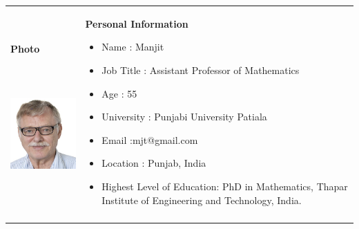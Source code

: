 \documentclass[12pt]{article}
\begin{document}


\begin{table}[H]
 			\centering
\begin{tabular}{p{1.6in}p{4.09in}}
\hline
\multicolumn{1}{|p{1.6in}}{{\fontsize{10pt}{12.0pt}\selectfont \textbf{Photo}} \par {\fontsize{10pt}{12.0pt}\selectfont \textbf{\ \ \ \ \   }} \par 
	\begin{Center}
		\includegraphics[width=1.6in,height=1.36in]{./media/image2.png}
	\end{Center}
} & 
\multicolumn{1}{|p{4.09in}|}{{\fontsize{10pt}{12.0pt}\selectfont \textbf{Personal Information}} \par \begin{itemize}
	\item {\fontsize{10pt}{12.0pt}\selectfont Name : Manjit} \par 	\item {\fontsize{10pt}{12.0pt}\selectfont Job Title : Assistant Professor of Mathematics} \par 	\item {\fontsize{10pt}{12.0pt}\selectfont Age : 55} \par 	\item {\fontsize{10pt}{12.0pt}\selectfont University : Punjabi University Patiala} \par 	\item {\fontsize{10pt}{12.0pt}\selectfont Email :mjt@gmail.com} \par 	\item {\fontsize{10pt}{12.0pt}\selectfont Location : Punjab, India} \par 	\item {\fontsize{10pt}{12.0pt}\selectfont Highest Level of Education: PhD in Mathematics, Thapar Institute of Engineering and Technology, India.} \par 
\end{itemize}} \\
\hhline{--}
\multicolumn{2}{|p{6.29in}|}{{\fontsize{10pt}{12.0pt}\selectfont \textbf{Skills}} \par \begin{itemize}

\end{itemize}}
\end{tabular}
\end{table}
\end{document}
